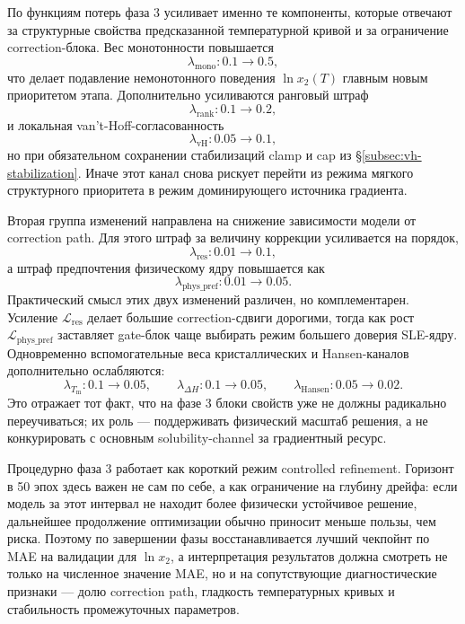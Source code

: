 \documentclass[11pt]{article}
\begin{document}
По функциям потерь фаза 3 усиливает именно те компоненты, которые отвечают за структурные свойства предсказанной температурной кривой и за ограничение correction-блока. Вес монотонности повышается
\begin{equation*}
\lambda_{\mathrm{mono}}: 0.1 \to 0.5,
\end{equation*}
что делает подавление немонотонного поведения $\ln x_2(T)$ главным новым приоритетом этапа. Дополнительно усиливаются ранговый штраф
\begin{equation*}
\lambda_{\mathrm{rank}}: 0.1 \to 0.2,
\end{equation*}
и локальная van't-Hoff-согласованность
\begin{equation*}
\lambda_{\mathrm{vH}}: 0.05 \to 0.1,
\end{equation*}
но при обязательном сохранении стабилизаций clamp и cap из §\ref{subsec:vh-stabilization}. Иначе этот канал снова рискует перейти из режима мягкого структурного приоритета в режим доминирующего источника градиента.

Вторая группа изменений направлена на снижение зависимости модели от correction path. Для этого штраф за величину коррекции усиливается на порядок,
\begin{equation*}
\lambda_{\mathrm{res}}: 0.01 \to 0.1,
\end{equation*}
а штраф предпочтения физическому ядру повышается как
\begin{equation*}
\lambda_{\mathrm{phys\_pref}}: 0.01 \to 0.05.
\end{equation*}
Практический смысл этих двух изменений различен, но комплементарен. Усиление $\mathcal{L}_{\mathrm{res}}$ делает большие correction-сдвиги дорогими, тогда как рост $\mathcal{L}_{\mathrm{phys\_pref}}$ заставляет gate-блок чаще выбирать режим большего доверия SLE-ядру. Одновременно вспомогательные веса кристаллических и Hansen-каналов дополнительно ослабляются:
\begin{equation*}
\lambda_{T_{\mathrm{m}}}: 0.1 \to 0.05, \qquad
\lambda_{\Delta H}: 0.1 \to 0.05, \qquad
\lambda_{\mathrm{Hansen}}: 0.05 \to 0.02.
\end{equation*}
Это отражает тот факт, что на фазе 3 блоки свойств уже не должны радикально переучиваться; их роль --- поддерживать физический масштаб решения, а не конкурировать с основным solubility-channel за градиентный ресурс.

Процедурно фаза 3 работает как короткий режим controlled refinement. Горизонт в 50 эпох здесь важен не сам по себе, а как ограничение на глубину дрейфа: если модель за этот интервал не находит более физически устойчивое решение, дальнейшее продолжение оптимизации обычно приносит меньше пользы, чем риска. Поэтому по завершении фазы восстанавливается лучший чекпойнт по MAE на валидации для $\ln x_2$, а интерпретация результатов должна смотреть не только на численное значение MAE, но и на сопутствующие диагностические признаки --- долю correction path, гладкость температурных кривых и стабильность промежуточных параметров.
\end{document}
